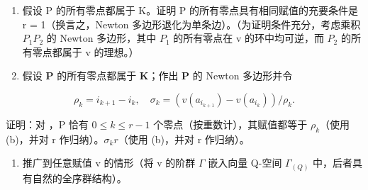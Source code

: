 \begin{enumerate}
\def\labelenumi{(\alph{enumi})}
\setcounter{enumi}{1}
\item
  假设 P 的所有零点都属于 K。证明 P 的所有零点具有相同赋值的充要条件是 r = 1（换言之，Newton 多边形退化为单条边）。（为证明条件充分，考虑乘积 \(P_{1}P_{2}\) 的 Newton 多边形，其中 \(P_{1}\) 的所有零点在 v 的环中均可逆，而 \(P_{2}\) 的所有零点都属于 v 的理想。）
\item
  假设 \(\mathbf{P}\) 的所有零点都属于 \(\mathbf{K}\)；作出 \(\mathbf{P}\) 的 Newton 多边形并令
\end{enumerate}

\[
\rho_ {k} = i _ {k + 1} - i _ {k}, \quad \sigma_ {k} = (v (a _ {i _ {k + 1}}) - v (a _ {i _ {k}})) / \rho_ {k}.
\]

证明：对 ，P 恰有 \(0 \leqslant k \leqslant r - 1\) 个零点（按重数计），其赋值都等于 \(\rho_k\)（使用 (b)，并对 r 作归纳）。\(\sigma_k\)\(r\)（使用 (b)，并对 r 作归纳）。

\begin{enumerate}
\def\labelenumi{(\alph{enumi})}
\setcounter{enumi}{3}
\tightlist
\item
  推广到任意赋值 v 的情形（将 v 的阶群 \(\Gamma\) 嵌入向量 Q-空间 \(\Gamma_{(Q)}\) 中，后者具有自然的全序群结构）。
\end{enumerate}

